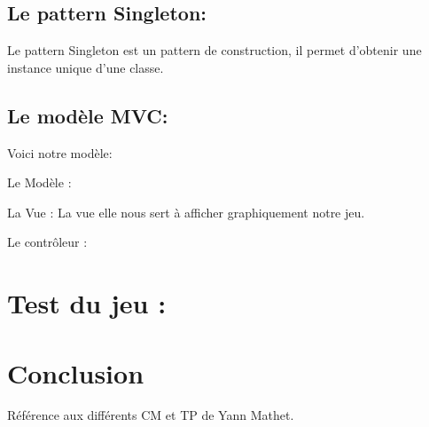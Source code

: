 \documentclass{article}
\begin{document}
\subsection{Le pattern Singleton:}

Le pattern Singleton est un pattern de construction, il permet d'obtenir une instance unique d'une classe.

\subsection{Le modèle MVC:}

Voici notre modèle:

\vspace{1\baselineskip}

Le Modèle :

La Vue : La vue elle nous sert à afficher graphiquement notre jeu.

Le contrôleur :


\section{Test du jeu :}

\section{Conclusion}







\vspace{1\baselineskip}

Référence aux différents CM et TP de Yann Mathet.
\end{document}
